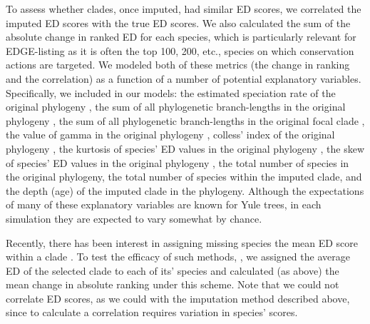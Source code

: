 \documentclass[12pt,english]{article}
\begin{document}
To assess whether clades, once imputed, had similar ED scores, we correlated the
imputed ED scores with the true ED scores. We also calculated the sum of the
absolute change in ranked ED for each species, which is particularly relevant
for EDGE-listing as it is often the top 100, 200, etc., species on which
conservation actions are targeted. We modeled both of these metrics (the change
in ranking and the correlation) as a function of a number of potential
explanatory variables. Specifically, we included in our models: the estimated
speciation rate of the original phylogeny \autocite[using
\texttt{ape::yule};][]{Paradis2004}, the sum of all phylogenetic branch-lengths
in the original phylogeny \autocite[Faith's PD;][]{Faith1992}, the sum of all
phylogenetic branch-lengths in the original focal clade \autocite[Faith's
PD;][]{Faith1992}, the value of gamma in the original phylogeny \autocite[using
\texttt{phytools::gammatest};][]{Pybus2000, Revell2012}, colless' index of the
original phylogeny
\autocite[using\texttt{apTreeshape::as.treeshape};][]{Colless1982,
Bortolussi2009}, the kurtosis of species' ED values in the original phylogeny
\autocite[using \texttt{moments::kurtosis};][]{Komsta2015}, the skew of species'
ED values in the original phylogeny \autocite[using
\texttt{moments::skew};][]{Komsta2015}, the total number of species in the
original phylogeny, the total number of species within the imputed clade, and
the depth (age) of the imputed clade in the phylogeny. Although the expectations
of many of these explanatory variables are known for Yule trees, in each
simulation they are expected to vary somewhat by chance.

Recently, there has been interest in assigning missing species the
mean ED score within a clade \autocite[see][]{Gumbs2017}. To test the
efficacy of such methods, , we assigned the average ED of the selected
clade to each of its' species and calculated (as above) the mean
change in absolute ranking under this scheme. Note that we could not
correlate ED scores, as we could with the imputation method described
above, since to calculate a correlation requires variation in species'
scores.
\end{document}
